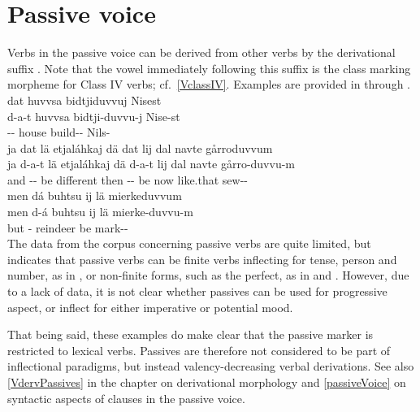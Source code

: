 \section{Passive voice}\label{passiveVinflection}
Verbs in the passive voice can be derived from other verbs by the derivational suffix . Note that the vowel immediately following this suffix is the class marking morpheme for Class IV verbs; cf.~\SEC\ref{VclassIV}. 
Examples are provided in  through . 
\ea\label{passEx4}%
\glll	dat huvvsa bidtjiduvvuj Nisest\\
	d-a-t huvvsa bidtji-duvvu-j Nise-st\\
	-- house\BS{} build-- Nils-\\\nopagebreak
{}	
\z
\ea\label{passEx1a}%
\glll	ja dat lä etjaláhkaj dä dat lij dal navte gårroduvvum\\
	ja d-a-t lä etjaláhkaj dä d-a-t lij dal navte gårro-duvvu-m\\
	and -- be\BS{} different then -- be\BS{} now like.that sew--\\\nopagebreak
{}	
\z
\ea\label{passEx1b}%
\glll	men dá buhtsu ij lä mierkeduvvum\\
	men d-á buhtsu ij lä mierke-duvvu-m\\
	but -\BS{} reindeer\BS{} \BS{} be\BS{} mark--\\\nopagebreak
{}	
\z
The data from the corpus concerning passive verbs are quite limited, but indicates that passive verbs can be finite verbs inflecting for tense, person and number, as in , or non-finite forms, such as the perfect, as in  and . However, due to a lack of data, it is not clear whether passives can be used for progressive aspect, or inflect for either imperative or potential mood. 

That being said, these examples do make clear that the passive marker is restricted to lexical verbs. %
Passives are therefore not considered to be part of inflectional paradigms, but instead valency-decreasing verbal derivations. See also \SEC\ref{VdervPassives} in the chapter on derivational morphology and \SEC\ref{passiveVoice} on syntactic aspects of clauses in the passive voice. 

